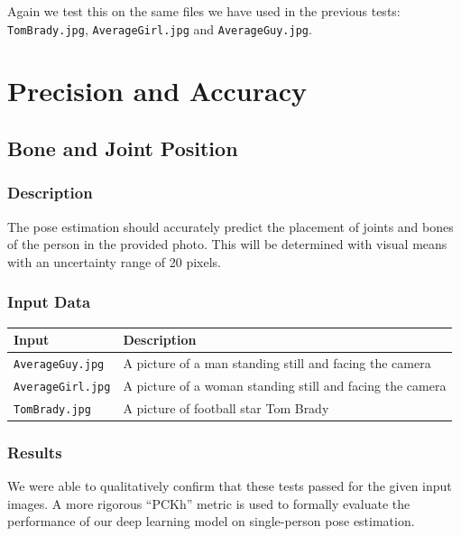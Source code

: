 \documentclass{scrreprt}
\begin{document}
Again we test this on the same files we have used in the previous tests:
\verb|TomBrady.jpg|, \verb|AverageGirl.jpg| and \verb|AverageGuy.jpg|.

\section{Precision and Accuracy}
\subsection{Bone and Joint Position}
\subsubsection{Description}

The pose estimation should accurately predict the placement of joints and bones
of the person in the provided photo. This will be determined with visual means
with an uncertainty range of 20 pixels.

\subsubsection{Input Data}

\begin{table}[H]
        \centering
        \begin{tabular}{p{3cm}p{6cm}}
                \hline\hline
                Input & Description\\
                \hline\hline
                \verb|AverageGuy.jpg| &  A picture of a man standing still and facing the camera\\
                \hline
                \verb|AverageGirl.jpg| &  A picture of a woman standing still and facing the camera\\
                \hline
                \verb|TomBrady.jpg| &  A picture of football star Tom Brady\\
                \hline
        \end{tabular}
\end{table}

\subsubsection{Results}

We were able to qualitatively confirm that these tests passed for the given
input images. A more rigorous ``PCKh'' metric is used to formally evaluate the
performance of our deep learning model on single-person pose estimation.
\end{document}
